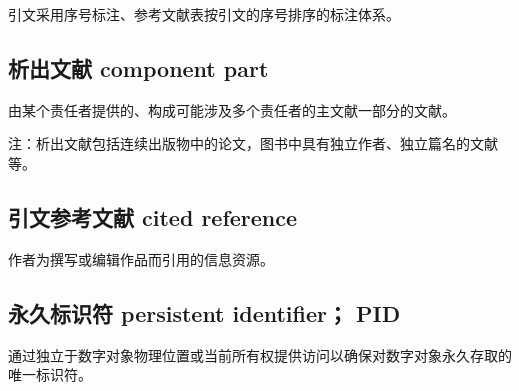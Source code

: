 \documentclass[twoside]{article}%
\begin{document}
{引文采用序号标注、参考文献表按引文的序号排序的标注体系。%

\subsection{析出文献 component part}
由某个责任者提供的、构成可能涉及多个责任者的主文献一部分的文献。

\mbox{}{\small 注：析出文献包括连续出版物中的论文，图书中具有独立作者、独立篇名的文献等。\par}

\subsection{引文参考文献 cited reference}\label{sec:concept:citeref}
作者为撰写或编辑作品而引用的信息资源。

\subsection{永久标识符 persistent identifier； PID}\label{sec:concept:pid}
通过独立于数字对象物理位置或当前所有权提供访问以确保对数字对象永久存取的唯一标识符。

}
\end{document}
